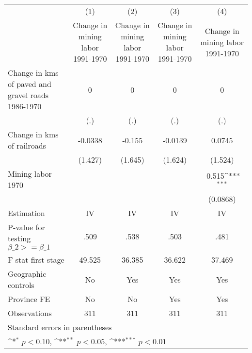 {
\def\sym#1{\ifmmode^{#1}\else\(^{#1}\)\fi}
\begin{tabular}{l*{4}{c}}
\hline\hline
                    &\multicolumn{1}{c}{(1)}&\multicolumn{1}{c}{(2)}&\multicolumn{1}{c}{(3)}&\multicolumn{1}{c}{(4)}\\
                    &\multicolumn{1}{c}{Change in mining labor 1991-1970}&\multicolumn{1}{c}{Change in mining labor 1991-1970}&\multicolumn{1}{c}{Change in mining labor 1991-1970}&\multicolumn{1}{c}{Change in mining labor 1991-1970}\\
\hline
Change in kms of paved and gravel roads 1986-1970&           0         &           0         &           0         &           0         \\
                    &         (.)         &         (.)         &         (.)         &         (.)         \\
[1em]
Change in kms of railroads&     -0.0338         &      -0.155         &     -0.0139         &      0.0745         \\
                    &     (1.427)         &     (1.645)         &     (1.624)         &     (1.524)         \\
[1em]
Mining labor 1970   &                     &                     &                     &      -0.515\sym{***}\\
                    &                     &                     &                     &    (0.0868)         \\
\hline
Estimation          &          IV         &          IV         &          IV         &          IV         \\
P-value for testing $\beta\_2 >= \beta\_1$&        .509         &        .538         &        .503         &        .481         \\
F-stat first stage  &      49.525         &      36.385         &      36.622         &      37.469         \\
Geographic controls &          No         &         Yes         &         Yes         &         Yes         \\
Province FE         &          No         &          No         &         Yes         &         Yes         \\
Observations        &         311         &         311         &         311         &         311         \\
\hline\hline
\multicolumn{5}{l}{\footnotesize Standard errors in parentheses}\\
\multicolumn{5}{l}{\footnotesize \sym{*} \(p<0.10\), \sym{**} \(p<0.05\), \sym{***} \(p<0.01\)}\\
\end{tabular}
}
